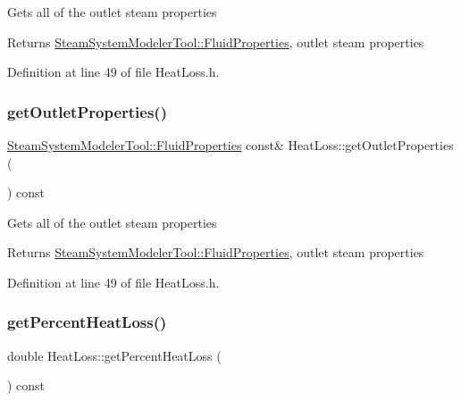 Gets all of the outlet steam properties \begin{DoxyReturn}{Returns}
\hyperlink{struct_steam_system_modeler_tool_1_1_fluid_properties}{Steam\+System\+Modeler\+Tool\+::\+Fluid\+Properties}, outlet steam properties 
\end{DoxyReturn}


Definition at line 49 of file Heat\+Loss.\+h.

\mbox{\label{class_heat_loss_a3e483dda6f393d67d7a0f28bcd75e545}} 
\subsubsection{\texorpdfstring{get\+Outlet\+Properties()}{getOutletProperties()}\hspace{0.1cm}{\footnotesize\ttfamily [3/3]}}
{\footnotesize\ttfamily \hyperlink{struct_steam_system_modeler_tool_1_1_fluid_properties}{Steam\+System\+Modeler\+Tool\+::\+Fluid\+Properties} const\& Heat\+Loss\+::get\+Outlet\+Properties (\begin{DoxyParamCaption}{ }\end{DoxyParamCaption}) const\hspace{0.3cm}{\ttfamily [inline]}}

Gets all of the outlet steam properties \begin{DoxyReturn}{Returns}
\hyperlink{struct_steam_system_modeler_tool_1_1_fluid_properties}{Steam\+System\+Modeler\+Tool\+::\+Fluid\+Properties}, outlet steam properties 
\end{DoxyReturn}


Definition at line 49 of file Heat\+Loss.\+h.

\mbox{\label{class_heat_loss_acbbf01db5cde157057e4d766cab22382}} 
\subsubsection{\texorpdfstring{get\+Percent\+Heat\+Loss()}{getPercentHeatLoss()}\hspace{0.1cm}{\footnotesize\ttfamily [1/3]}}
{\footnotesize\ttfamily double Heat\+Loss\+::get\+Percent\+Heat\+Loss (\begin{DoxyParamCaption}{ }\end{DoxyParamCaption}) const\hspace{0.3cm}{\ttfamily [inline]}}

